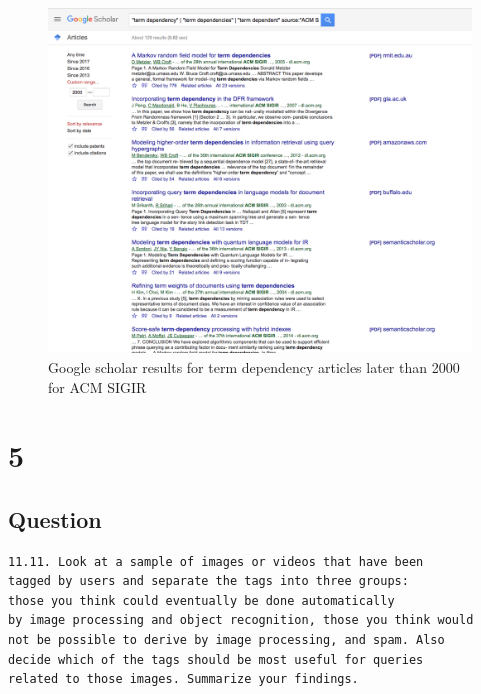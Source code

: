 \documentclass[letterpaper,11pt]{article}
\newcommand*{\srcPath}{../src}%
\begin{document}
 


\begin{figure}[h]
\centering
\includegraphics[scale=0.4]{sigir.png}
\caption{Google scholar results for term dependency articles later than 2000 for ACM SIGIR}
\label{fig:sigir}
\end{figure}

\clearpage


\section*{5}

\subsection*{Question}

\begin{verbatim}
11.11. Look at a sample of images or videos that have been 
tagged by users and separate the tags into three groups: 
those you think could eventually be done automatically
by image processing and object recognition, those you think would
not be possible to derive by image processing, and spam. Also 
decide which of the tags should be most useful for queries 
related to those images. Summarize your findings.
\end{verbatim}
\end{document}
